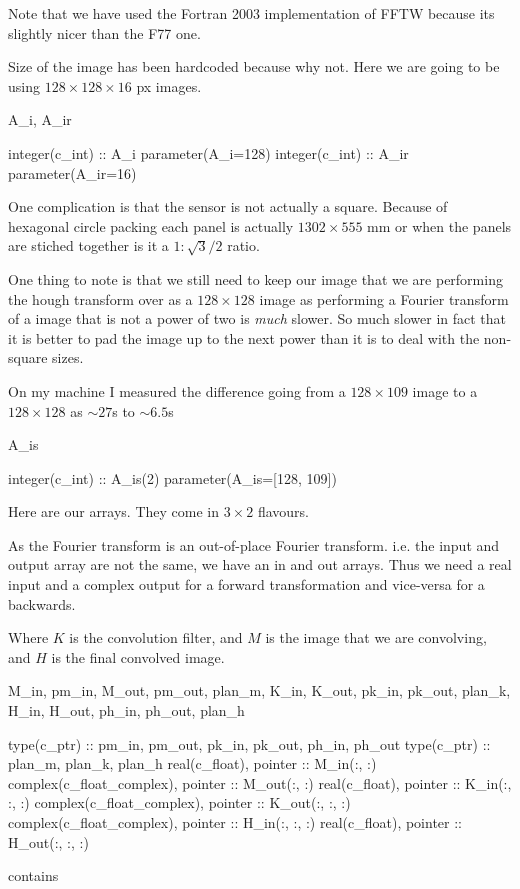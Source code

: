 \documentclass[10pt, a4paper]{article}
\begin{document}
Note that we have used the Fortran 2003 implementation of FFTW because its slightly nicer than the F77 one. 

Size of the image has been hardcoded because why not.
Here we are going to be using $128\times128\times16$ px images.  

\begin{codevar}{A_i, A_ir}
\begin{code}
	integer(c_int) :: A_i
	parameter(A_i=128)
	integer(c_int) :: A_ir
	parameter(A_ir=16)
	\end{code}
\end{codevar}

One complication is that the sensor is not actually a square. Because of hexagonal circle packing each panel is actually $1302\times555$ \si{\milli \metre} or when the panels are stiched together is it a $1:\sqrt{3}/2$ ratio. 

One thing to note is that we still need to keep our image that we are performing the hough transform over as a $128\times128$ image as performing a Fourier transform of a image that is not a power of two is \emph{much} slower. So much slower in fact that it is better to pad the image up to the next power than it is to deal with the non-square sizes. 

On my machine I measured the difference going from a $128\times109$ image to a $128\times128$ as $\sim27$\si{\second} to $\sim6.5$\si{\second}

\begin{codevar}{A_is}
\begin{code}
	integer(c_int) :: A_is(2)
	parameter(A_is=[128, 109])
	\end{code}
\end{codevar}

Here are our arrays. They come in $3\times2$ flavours.  

As the Fourier transform is an out-of-place Fourier transform. i.e. the input and output array are not the same, we have an in and out arrays. Thus we need a real input and a complex output for a forward transformation and vice-versa for a backwards.

Where $K$ is the convolution filter, and $M$ is the image that we are convolving, and $H$ is the final convolved image. 

\begin{codevar}{M_in, pm_in, M_out, pm_out, plan_m, K_in, K_out, pk_in, pk_out, plan_k, H_in, H_out, ph_in, ph_out, plan_h}
\begin{code}
	type(c_ptr) :: pm_in, pm_out, pk_in, pk_out, ph_in, ph_out
	type(c_ptr) :: plan_m, plan_k, plan_h
	real(c_float),            pointer :: M_in(:, :)
	complex(c_float_complex), pointer :: M_out(:, :)
	real(c_float),            pointer :: K_in(:, :, :)
	complex(c_float_complex), pointer :: K_out(:, :, :)
	complex(c_float_complex), pointer :: H_in(:, :, :)
	real(c_float),            pointer :: H_out(:, :, :)
	
	contains
\end{code}
\end{codevar}
\end{document}
